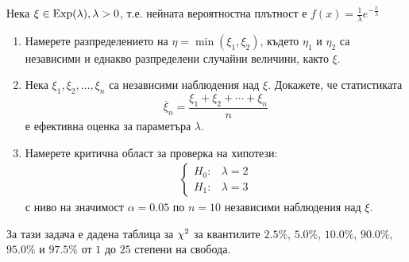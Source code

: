 \documentclass[numbers=endperiod, bibliography=totocnumbered]{scrartcl}
\begin{document}
\begin{exercise}\label{ex:se_summer2011}
  Нека \( \xi \in \operatorname{Exp}(\lambda), \lambda > 0 \), т.е. нейната вероятностна плътност е \( f(x) = \frac 1 \lambda e^{-\frac x \lambda} \)
  \begin{enumerate}[label=\alph*)]
    \item Намерете разпределението на \( \eta = \min(\xi_1, \xi_2) \), където \( \eta_1 \) и \( \eta_2 \) са независими и еднакво разпределени случайни величини, както \( \xi \).

    \item Нека \( \xi_1, \xi_2, \ldots, \xi_n \) са независими наблюдения над \( \xi \). Докажете, че статистиката
    \begin{equation*}
      \overline \xi_n = \frac {\xi_1 + \xi_2 + \cdots + \xi_n} n
    \end{equation*}
    е ефективна оценка за параметъра \( \lambda \).

    \item Намерете критична област за проверка на хипотези:
    \begin{align*}
      \begin{cases}
        H_0: &\lambda = 2 \\
        H_1: &\lambda = 3
      \end{cases}
    \end{align*}
    с ниво на значимост \( \alpha = 0.05 \) по \( n = 10 \) независими наблюдения над \( \xi \).
  \end{enumerate}
\end{exercise}

\begin{remark}
  За тази задача е дадена таблица за \( \chi^2 \) за квантилите \( 2.5\% \), \( 5.0\% \), \( 10.0\% \), \( 90.0\% \), \( 95.0\% \) и \( 97.5\% \) от \( 1 \) до \( 25 \) степени на свобода.
\end{remark}
\end{document}
